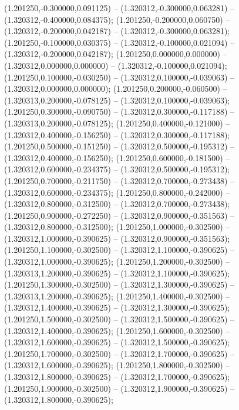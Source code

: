  (1.201250,-0.300000,0.091125) -- (1.320312,-0.300000,0.063281) -- (1.320312,-0.400000,0.084375);
 (1.201250,-0.200000,0.060750) -- (1.320312,-0.200000,0.042187) -- (1.320312,-0.300000,0.063281);
 (1.201250,-0.100000,0.030375) -- (1.320312,-0.100000,0.021094) -- (1.320312,-0.200000,0.042187);
 (1.201250,0.000000,0.000000) -- (1.320312,0.000000,0.000000) -- (1.320312,-0.100000,0.021094);
 (1.201250,0.100000,-0.030250) -- (1.320312,0.100000,-0.039063) -- (1.320312,0.000000,0.000000);
 (1.201250,0.200000,-0.060500) -- (1.320313,0.200000,-0.078125) -- (1.320312,0.100000,-0.039063);
 (1.201250,0.300000,-0.090750) -- (1.320312,0.300000,-0.117188) -- (1.320313,0.200000,-0.078125);
 (1.201250,0.400000,-0.121000) -- (1.320312,0.400000,-0.156250) -- (1.320312,0.300000,-0.117188);
 (1.201250,0.500000,-0.151250) -- (1.320312,0.500000,-0.195312) -- (1.320312,0.400000,-0.156250);
 (1.201250,0.600000,-0.181500) -- (1.320312,0.600000,-0.234375) -- (1.320312,0.500000,-0.195312);
 (1.201250,0.700000,-0.211750) -- (1.320312,0.700000,-0.273438) -- (1.320312,0.600000,-0.234375);
 (1.201250,0.800000,-0.242000) -- (1.320312,0.800000,-0.312500) -- (1.320312,0.700000,-0.273438);
 (1.201250,0.900000,-0.272250) -- (1.320312,0.900000,-0.351563) -- (1.320312,0.800000,-0.312500);
 (1.201250,1.000000,-0.302500) -- (1.320312,1.000000,-0.390625) -- (1.320312,0.900000,-0.351563);
 (1.201250,1.100000,-0.302500) -- (1.320312,1.100000,-0.390625) -- (1.320312,1.000000,-0.390625);
 (1.201250,1.200000,-0.302500) -- (1.320313,1.200000,-0.390625) -- (1.320312,1.100000,-0.390625);
 (1.201250,1.300000,-0.302500) -- (1.320312,1.300000,-0.390625) -- (1.320313,1.200000,-0.390625);
 (1.201250,1.400000,-0.302500) -- (1.320312,1.400000,-0.390625) -- (1.320312,1.300000,-0.390625);
 (1.201250,1.500000,-0.302500) -- (1.320312,1.500000,-0.390625) -- (1.320312,1.400000,-0.390625);
 (1.201250,1.600000,-0.302500) -- (1.320312,1.600000,-0.390625) -- (1.320312,1.500000,-0.390625);
 (1.201250,1.700000,-0.302500) -- (1.320312,1.700000,-0.390625) -- (1.320312,1.600000,-0.390625);
 (1.201250,1.800000,-0.302500) -- (1.320312,1.800000,-0.390625) -- (1.320312,1.700000,-0.390625);
 (1.201250,1.900000,-0.302500) -- (1.320312,1.900000,-0.390625) -- (1.320312,1.800000,-0.390625);
